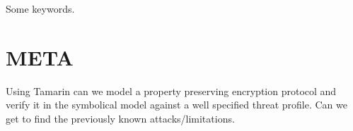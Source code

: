 \documentclass[journal]{IEEEtran}
\begin{document}
% 











\maketitle

\begin{abstract}
\cite{InfrenceAttacks}
\end{abstract}

\begin{IEEEkeywords}
Some keywords.
\end{IEEEkeywords}






%
\IEEEpeerreviewmaketitle

\section{META}
Using Tamarin can we model a property preserving encryption protocol and verify it in the symbolical model against a well specified threat profile. Can we get \tamarin{} to find the previously known attacks/limitations.
\end{document}
